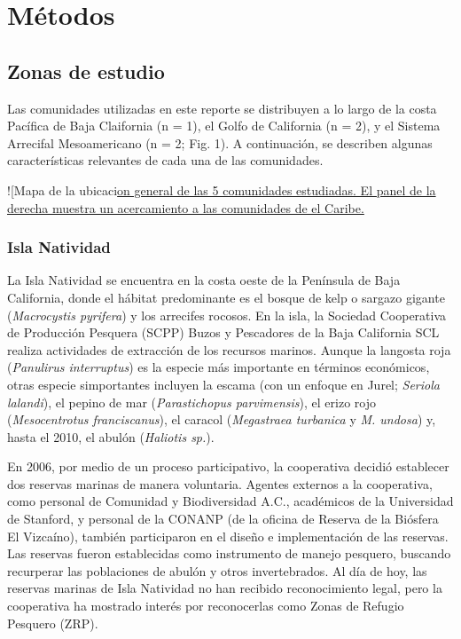 \documentclass[12pt,]{article}
\begin{document}
\clearpage

\section{Métodos}\label{metodos}

\subsection{Zonas de estudio}\label{zonas-de-estudio}

Las comunidades utilizadas en este reporte se distribuyen a lo largo de
la costa Pacífica de Baja Claifornia (n = 1), el Golfo de California (n
= 2), y el Sistema Arrecifal Mesoamericano (n = 2; Fig. 1). A
continuación, se describen algunas características relevantes de cada
una de las comunidades.

!{[}Mapa de la
ubicaci\href{Manuscript_files/figure-latex/unnamed-chunk-2-1.pdf}{on
general de las 5 comunidades estudiadas. El panel de la derecha muestra
un acercamiento a las comunidades de el Caribe.}

\subsubsection{Isla Natividad}\label{isla-natividad}

La Isla Natividad se encuentra en la costa oeste de la Península de Baja
California, donde el hábitat predominante es el bosque de kelp o sargazo
gigante (\emph{Macrocystis pyrifera}) y los arrecifes rocosos. En la
isla, la Sociedad Cooperativa de Producción Pesquera (SCPP) Buzos y
Pescadores de la Baja California SCL realiza actividades de extracción
de los recursos marinos. Aunque la langosta roja (\emph{Panulirus
interruptus}) es la especie más importante en términos económicos, otras
especie simportantes incluyen la escama (con un enfoque en Jurel;
\emph{Seriola lalandi}), el pepino de mar (\emph{Parastichopus
parvimensis}), el erizo rojo (\emph{Mesocentrotus franciscanus}), el
caracol (\emph{Megastraea turbanica} y \emph{M. undosa}) y, hasta el
2010, el abulón (\emph{Haliotis sp.}).

En 2006, por medio de un proceso participativo, la cooperativa decidió
establecer dos reservas marinas de manera voluntaria. Agentes externos a
la cooperativa, como personal de Comunidad y Biodiversidad A.C.,
académicos de la Universidad de Stanford, y personal de la CONANP (de la
oficina de Reserva de la Biósfera El Vizcaíno), también participaron en
el diseño e implementación de las reservas. Las reservas fueron
establecidas como instrumento de manejo pesquero, buscando recurperar
las poblaciones de abulón y otros invertebrados. Al día de hoy, las
reservas marinas de Isla Natividad no han recibido reconocimiento legal,
pero la cooperativa ha mostrado interés por reconocerlas como Zonas de
Refugio Pesquero (ZRP).
\end{document}
